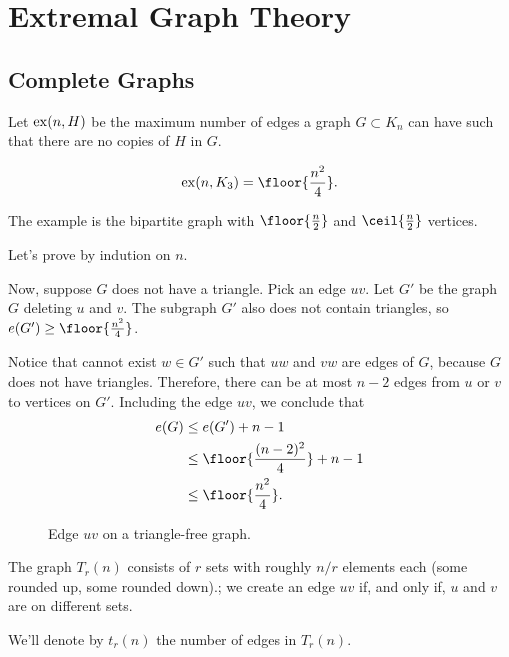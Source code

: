 \newpage
\section{Extremal Graph Theory}
\subsection{Complete Graphs}

\begin{defn}
	Let $\operatorname{ex}(n, H)$ be the maximum number of edges a graph  $G \subset K_n$ can have such that there are no copies of $H$ in $G$.
\end{defn}

\begin{thm}[Mantel, 1907]
	\[
		\ex(n, K_3) = \floor{\frac{n^2}{4}}.
	\]
\end{thm}

\begin{dem}
	The example is the bipartite graph with $\floor{\frac{n}{2}}$ and $\ceil{\frac{n}{2}}$ vertices.

	Let's prove by indution on $n$.

	Now, suppose $G$ does not have a triangle.
	Pick an edge $uv$. Let $G'$ be the graph $G$ deleting $u$ and $v$. The subgraph $G'$ also does not contain triangles, so $e(G') \ge \floor{\frac{n^2}{4}}$.

	Notice that cannot exist $w \in G'$ such that $uw$ and $vw$ are edges of $G$, because $G$ does not have triangles. Therefore, there can be at most $n-2$ edges from $u$ or $v$ to vertices on $G'$. Including the edge $uv$, we conclude that
	\begin{align*}
		e(G) &\le e(G') + n - 1\\
			 &\le \floor{\frac{(n-2)^2}{4}} + n - 1\\
			 &\le \floor{\frac{n^2}{4}}.
	\end{align*}
\end{dem}

\begin{figure}[ht]
    \centering
    \caption{Edge $uv$ on a triangle-free graph.}
    \label{fig:edge-uv-on-a-triangle-less-graph}
\end{figure}

\begin{defn}
	The graph $T_r(n)$ consists of $r$ sets with roughly $n/r$ elements each (some rounded up, some rounded down).; we create an edge $uv$ if, and only if, $u$ and $v$ are on different sets.

	We'll denote by $t_r(n)$ the number of edges in $T_r(n)$.
\end{defn}


